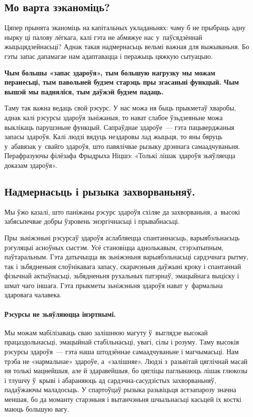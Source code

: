 \subsection*{Мо варта зэканоміць?} 

Цяпер прынята эканоміць на капітальных укладаньнях: чаму б не прыбраць адну нырку ці палову лёгкага, калі гэта не абмяжуе нас у~паўсядзённай жыцьцядзейнасьці? Аднак такая надмернасьць вельмі важная для выжываньня. Бо гэты запас дапамагае нам адаптавацца і перажыць цяжкую сытуацыю. 

\textbf{Чым большы «запас здароўя», тым большую нагрузку мы можам перанесьці, тым павольней будзем старэць пры згасаньні функцый. Чым вышэй мы падняліся, тым даўжэй будзем падаць.}

Таму так важна ведаць свой рэсурс. У нас можа ня быць прыкметаў хваробы, аднак калі рэсурсы здароўя зьніжаныя, то нават слабое ўзьдзеяньне можа выклікаць парушэньне функцый. Сапраўднае здароўе~--- гэта пацьверджаныя запасы здароўя. Калі людзі вядуць нездаровы лад жыцьця, то яны бяруць у~абавязак у~свайго здароўя, што павялічвае рызыку дрэннага самаадчуваньня. Перафразуючы філёзафа Фрыдрыха Ніцшэ: «Толькі лішак здароўя зьяўляецца доказам здароўя».

\subsection*{Надмернасьць і рызыка захворваньняў.} 

Мы ўжо казалі, што паніжаны рэсурс здароўя схіляе да захворваньня, а~высокі забясьпечвае добры ўзровень энэргічнасьці і прывабнасьці. 

Пры зьніжэньні рэсурсаў здароўя аслабляецца спантаннасьць, варыябэльнасьць рэгуляцыі асноўных сыстэм. Усё становіцца аднолькавым, стэрэатыпным, паўтаральным. Гэта датычыцца як зьніжэньня варыябэльнасьці сардэчнага рытму, так і зьбядненьня слоўнікавага запасу, скарачэньня даўжыні кроку і спантаннай фізычнай актыўнасьці, зьбядненьня рухальных патэрнаў, эмацыйнага выціску і шмат чаго іншага. Гэта прыкметы зьніжэньня здароўя нават у~фармальна здаровага чалавека.

\paragraph{Рэсурсы не зьяўляюцца інэртнымі.} Мы можам мабілізаваць сваю залішнюю магуту ў~выглядзе высокай працаздольнасьці, эмацыйнай стабільнасьці, увагі, сілы і розуму. Таму высокія рэсурсы здароўя~--- гэта наша штодзённае самаадчуваньне і магчымасьці. Нам трэба не «нармальнае» здароўе, а~«залішняе». Людзі з~разьвітай цяглічнай масай ня толькі мацнейшыя, але й здаравейшыя, бо цягліцы паглынаюць лішак глюкозы і тлушчу ў~крыві і абараняюць ад сардэчна-сасудзістых захворваньняў, падаўжаючы маладосьць. У спартоўцаў рызыка разьвіцьця астэапарозу значна меншая, бо да моманту старэньня і вытанчэньня шчыльнасьці касьцей іх косткі маюць большую вагу.

